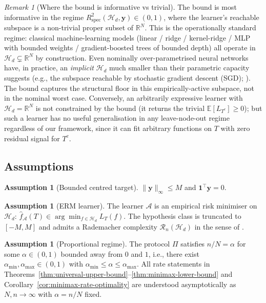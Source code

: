 \documentclass[11pt,a4paper]{article}
\theoremstyle{plain}
\theoremstyle{definition}
\newtheorem{assumption}[theorem]{Assumption}
\theoremstyle{remark}
\newtheorem{remark}[theorem]{Remark}
\newcommand{\by}{\mathbf{y}}
\newcommand{\bone}{\mathbf{1}}
\newcommand{\E}{\mathbb{E}}
\newcommand{\R}{\mathbb{R}}
\newcommand{\Rspec}{R^2_{\mathrm{spec}}}
\newcommand{\Acal}{\mathcal{A}}
\newcommand{\Hcal}{\mathcal{H}}
\begin{document}
\begin{remark}[Where the bound is informative vs trivial]
\label{rem:trivial-vs-informative}
The bound is most informative in the regime $\Rspec(\Hcal_d, \by) \in
(0, 1)$, where the learner's reachable subspace is a non-trivial
proper subset of $\R^N$.  This is the operationally standard regime:
classical machine-learning models (linear / ridge / kernel-ridge / MLP
with bounded weights / gradient-boosted trees of bounded depth) all
operate in $\Hcal_d \subsetneq \R^N$ by construction.  Even
nominally over-parametrised neural networks have, in practice, an
\emph{implicit} $\Hcal_d$ much smaller than their parametric capacity
suggests (e.g., the subspace reachable by stochastic gradient descent
(SGD); \citealp{NeyshaburTomiokaSrebro2014}).  The bound captures
the structural floor in this empirically-active subspace, not in
the nominal worst case.  Conversely, an arbitrarily expressive learner
with $\Hcal_d = \R^N$ is not constrained by the bound (it returns the
trivial $\E[L_{T^c}] \geq 0$); but such a learner has no useful
generalisation in any leave-node-out regime regardless of our
framework, since it can fit arbitrary functions on $T$ with zero
residual signal for $T^c$.
\end{remark}

\subsection{Assumptions}

\begin{assumption}[Bounded centred target]
\label{a:target}
$\|\by\|_\infty \leq M$ and $\bone^\top \by = 0$.
\end{assumption}

\begin{assumption}[ERM learner]
\label{a:erm}
The learner $\Acal$ is an empirical risk minimiser on $\Hcal_d$:
$\hat f_\Acal(T) \in \arg\min_{f \in \Hcal_d} L_T(f)$.  The hypothesis
class is truncated to $[-M, M]$ and admits a Rademacher complexity
$\mathcal{R}_n(\Hcal_d)$ in the sense of \citet[][\S 3.3]{Mohri2018book}.
\end{assumption}

\begin{assumption}[Proportional regime]
\label{a:proportional}
The protocol $\Pi$ satisfies $n/N = \alpha$ for some $\alpha \in
(0, 1)$ bounded away from $0$ and $1$, i.e., there exist
$\alpha_{\min}, \alpha_{\max} \in (0, 1)$ with $\alpha_{\min} \le
\alpha \le \alpha_{\max}$. All rate statements in
Theorems~\ref{thm:universal-upper-bound}--\ref{thm:minimax-lower-bound}
and Corollary~\ref{cor:minimax-rate-optimality} are understood
asymptotically as $N, n \to \infty$ with $\alpha = n/N$ fixed.
\end{assumption}
\end{document}
